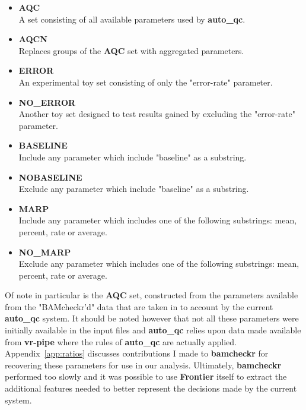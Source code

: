 \begin{itemize}
    \item \textbf{AQC} \hfill\\
        A set consisting of all available parameters used by \textbf{auto\_qc}.
    \item \textbf{AQCN} \hfill\\
        Replaces groups of the \textbf{AQC} set with aggregated parameters.
    \item \textbf{ERROR} \hfill\\
        An experimental toy set consisting of only the "error-rate" parameter.
    \item \textbf{NO\_ERROR} \hfill\\
        Another toy set designed to test results gained by excluding the
        "error-rate" parameter.
    \item \textbf{BASELINE} \hfill\\
        Include any parameter which include "baseline" as a substring.
    \item \textbf{NOBASELINE} \hfill\\
        Exclude any parameter which include "baseline" as a substring.
    \item \textbf{MARP} \hfill\\
        Include any parameter which includes one of the following substrings:
        mean, percent, rate or average.
    \item \textbf{NO\_MARP} \hfill\\
        Exclude any parameter which includes one of the following substrings:
        mean, percent, rate or average.
\end{itemize}

Of note in particular is the \textbf{AQC} set, constructed from the parameters
available from the "BAMcheckr'd" data that are taken in to account by the
current \textbf{auto\_qc} system. It should be noted however that not all these
parameters were initially available in the input files and \textbf{auto\_qc}
relies upon data made available from \textbf{vr-pipe} where the rules of
\textbf{auto\_qc} are actually applied. Appendix~\ref{app:ratios} discusses
contributions I made to \textbf{bamcheckr} for recovering these parameters for
use in our analysis. Ultimately, \textbf{bamcheckr} performed too slowly and it
was possible to use \textbf{Frontier} itself to extract the additional features
needed to better represent the decisions made by the current system.

